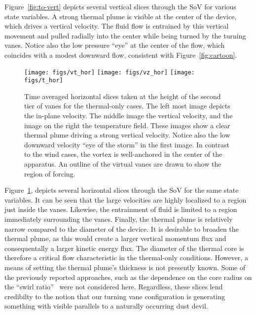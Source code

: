 %
%
%
Figure~\ref{fig:to-vert} depicts several vertical slices through the SoV
for various state variables. A strong thermal plume is visible at the
center of the device, which drives a vertical velocity. The fluid flow
is entrained by this vertical movement and pulled radially into the
center while being turned by the turning vanes. Notice also the low
pressure ``eye'' at the center of the flow, which coincides with a 
modest downward flow, consistent with Figure~\ref{fig:cartoon}. 

\begin{figure}[htb]

 \centering
  \texttt{[image: figs/vt\_hor]}
 \hfill
  \texttt{[image: figs/vz\_hor]}
 \hfill
  \texttt{[image: figs/t\_hor]}
 \caption{Time averaged horizontal slices taken at the height of the
 second tier of vanes for the thermal-only cases. The left most image
 depicts the in-plane velocity. The middle image the vertical velocity,
 and the image on the right the temperature field. These images show a
 clear thermal plume driving a strong vertical velocity. Notice also the
 low downward velocity ``eye of the storm'' in the first image. In
 contrast to the wind cases, the vortex is well-anchored in the center
 of the apparatus. An outline of the virtual vanes are drawn to show the
 region of forcing.}
 \label{fig:to-hor}
\end{figure}

Figure~\ref{fig:to-hor}, depicts several horizontal slices
through the SoV for the same state variables. It can be seen that the
large velocities are highly localized to a region just inside the
vanes. Likewise, the entrainment of fluid is limited to a region
immediately surrounding the vanes.
%
%
Finally, the thermal plume is relatively narrow compared to the diameter
of the device. It is desirable to broaden the thermal plume, as this
would create a larger vertical momentum flux and consequentally a larger
kinetic energy flux.  
The diameter of the thermal core is therefore a critical flow
characteristic in the thermal-only conditions. However, a means of
setting the thermal plume's thickness is not presently 
known. Some of the previously reported approaches, such as the
dependence on the core radius on the  ``swirl
ratio''~\cite{davies1973dependence} were not considered here. 
Regardless, these slices lend credibilty to the 
notion that our turning vane configuration is generating something with  
visible parallels to a naturally occurring dust devil.   

